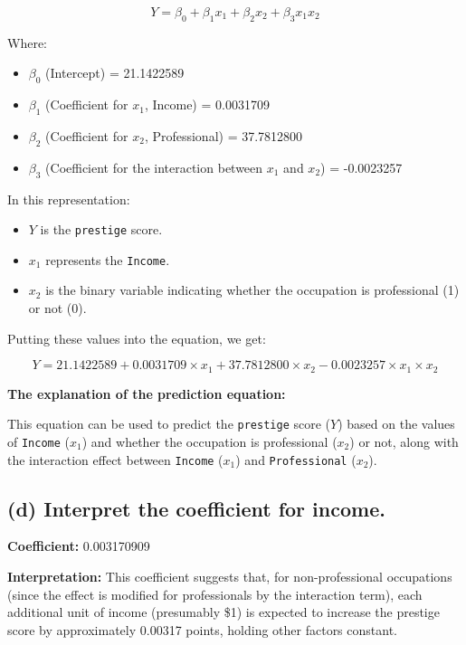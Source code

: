 \documentclass[12pt]{article}
\begin{document}
\begin{equation}
Y = \beta_0 + \beta_1x_1 + \beta_2x_2 + \beta_3x_1x_2
\end{equation}

Where:
\begin{itemize}
    \item \( \beta_0 \) (Intercept) = 21.1422589
    \item \( \beta_1 \) (Coefficient for \(x_1\), Income) = 0.0031709
    \item \( \beta_2 \) (Coefficient for \(x_2\), Professional) = 37.7812800
    \item \( \beta_3 \) (Coefficient for the interaction between \(x_1\) and \(x_2\)) = -0.0023257
\end{itemize}

In this representation:
\begin{itemize}
    \item \(Y\) is the \texttt{prestige} score.
    \item \(x_1\) represents the \texttt{Income}.
    \item \(x_2\) is the binary variable indicating whether the occupation is professional (1) or not (0).
\end{itemize}

Putting these values into the equation, we get:

\begin{equation}
Y = 21.1422589 + 0.0031709 \times x_1 + 37.7812800 \times x_2 - 0.0023257 \times x_1 \times x_2
\end{equation}


\textbf{The explanation of the prediction equation:}

This equation can be used to predict the \texttt{prestige} score (\(Y\)) based on the values of \texttt{Income} (\(x_1\)) and whether the occupation is professional (\(x_2\)) or not, along with the interaction effect between \texttt{Income} (\(x_1\)) and \texttt{Professional} (\(x_2\)).

\subsection{(d) Interpret the coefficient for income.}

\textbf{Coefficient:} 0.003170909

\textbf{Interpretation: }This coefficient suggests that, for non-professional occupations (since the effect is modified for professionals by the interaction term), each additional unit of income (presumably \$1) is expected to increase the prestige score by approximately 0.00317 points, holding other factors constant.
\end{document}
